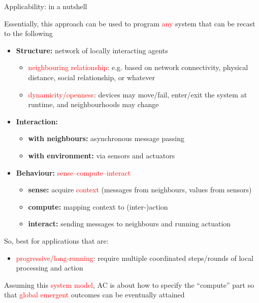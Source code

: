 \documentclass[presentation, 9pt]{beamer}\mode<presentation>{\usetheme{AMSBolognaFC}}
\newcommand{\lbl}[1]{\textbf{\textcolor{gray!90!white}{#1}}}
\newcommand{\enf}[1]{{\textcolor{red}{#1}}}
\begin{document}
\begin{frame}[fragile]{Applicability: in a nutshell}\label{applicability}

Essentially, this approach can be used to program \enf{any} system that can be recast to the following

\begin{itemize}
\item \lbl{Structure:} network of locally interacting agents
	\begin{itemize}
	\item \enf{neighbouring relationship}: e.g. based on network connectivity, physical distance, social relationship, or whatever
	\item \enf{dynamicity/openness}: devices may move/fail, enter/exit the system at runtime, and neighbourhoods may change
	\end{itemize}
\item \lbl{Interaction:} 
	\begin{itemize}
	\item \lbl{with neighbours:} asynchronous message passing
	\item \lbl{with environment:} via sensors and actuators
	\end{itemize}
\item \lbl{Behaviour:} \enf{sense--compute--interact}
	\begin{itemize}
	\item \lbl{sense:} acquire \enf{context} (messages from neighbours, values from sensors)
	\item \lbl{compute:} mapping context to (inter-)action
	\item \lbl{interact:} sending messages to neighbours and running actuation
	\end{itemize}
\end{itemize}

So, best for applications that are:
\begin{itemize}
\item \enf{progressive/long-running}: require multiple coordinated steps/rounds of local processing and action
\end{itemize}

Assuming this \enf{system model}, AC is about how to specify the ``compute'' part so that \enf{global emergent} outcomes can be eventually attained 

\end{frame}
\end{document}
